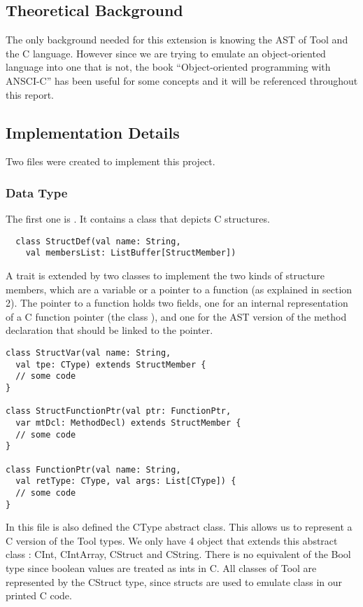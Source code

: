 \subsection{Theoretical Background}
The only background needed for this extension is knowing the AST of Tool and the C language.
However since we are trying to emulate an object-oriented language into one that is not,
the book ``Object-oriented programming with ANSCI-C''\cite{oopBook}
has been useful for some concepts and it will be referenced throughout this report.

\subsection{Implementation Details}
Two files were created to implement this project.
\subsubsection{Data Type}
The first one is . It contains a class that depicts C structures.
\lstset{style=customscala}
\begin{lstlisting}
  class StructDef(val name: String,
    val membersList: ListBuffer[StructMember])
\end{lstlisting}
 A trait  is extended by two classes to implement the two kinds of structure members,
 which are a variable or a pointer to a function (as explained in section 2).
 The pointer to a function holds two fields, one for an internal representation of a C function pointer (the class ),
 and one for the AST version of the method declaration that should be linked to the pointer.

 \begin{lstlisting}
class StructVar(val name: String,
  val tpe: CType) extends StructMember {
  // some code
}

class StructFunctionPtr(val ptr: FunctionPtr,
  var mtDcl: MethodDecl) extends StructMember {
  // some code
}

class FunctionPtr(val name: String,
  val retType: CType, val args: List[CType]) {
  // some code
}
 \end{lstlisting}
In this file is also defined the CType abstract class. This allows us to represent a C version of the Tool types. We only have 4 object that extends this abstract class : CInt, CIntArray, CStruct and CString. There is no equivalent of the Bool type since boolean values are treated as ints in C. All classes of Tool are represented by the CStruct type, since structs are used to emulate class in our printed C code.

